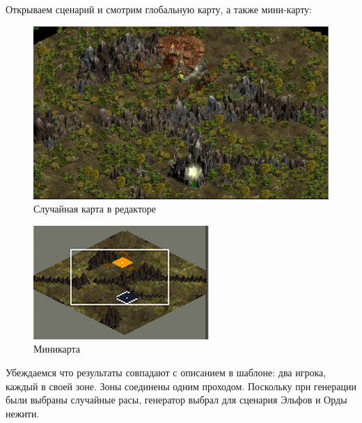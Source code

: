 Открываем сценарий и смотрим глобальную карту, а также мини-карту:

\begin{figure}[H]
\center
\includegraphics[width=1.0\linewidth]{docImages/scenarioMap.png}
\caption{Случайная карта в редакторе}
\end{figure}

\begin{figure}[H]
\center
\includegraphics[width=.48\linewidth]{docImages/scenarioMinimap.png}
\caption{Миникарта}
\end{figure}

Убеждаемся что результаты совпадают с описанием в шаблоне: два игрока, каждый в своей зоне. Зоны соединены одним проходом. Поскольку при генерации были выбраны случайные расы, генератор выбрал для сценария Эльфов и Орды нежити.